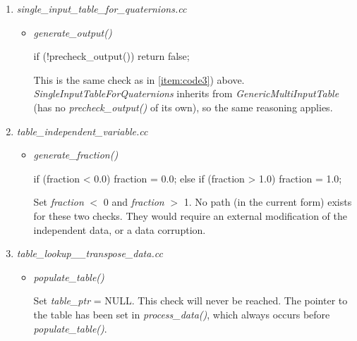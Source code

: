 \documentclass[11pt,fleqn]{report}
\begin{document}
\begin{enumerate}
 \item \textit{single\_input\_table\_for\_quaternions.cc}
   \begin{itemize}
      \item \textit{generate\_output()}
      \begin{code}
if (!precheck_output()) {
  return false;
}
      \end{code}
      This is the same check as in \ref{item:code3}) above.
       \textit{SingleInputTableForQuaternions} inherits from
        \textit{GenericMultiInputTable} (has no \textit{precheck\_output()}
         of its own), so the same reasoning applies.
   \end{itemize}

  \item \textit{table\_independent\_variable.cc}
   \begin{itemize}
      \item \textit{generate\_fraction()}
      \begin{code}
if (fraction < 0.0) {
  fraction = 0.0;
}
else if (fraction > 1.0) {
  fraction = 1.0;
}
      \end{code}
      Set \textit{fraction} $<$ 0 and \textit{fraction} $>$ 1.  No path (in the
      current form) exists for these two checks.  They would require an external
      modification of the independent data, or a data corruption.
   \end{itemize}

   \item \textit{table\_lookup\_\_transpose\_data.cc}
    \begin{itemize}
       \item \textit{populate\_table()}
       \begin{code}
if (table_ptr == NULL) {
  MessageHandler::fail(
      \end{code}
      Set \textit{table\_ptr} = NULL.  This check will never be reached.  The
      pointer to the table has been set in \textit{process\_data()}, which always
      occurs before \textit{populate\_table()}.
    \end{itemize}
\end{enumerate}
\end{document}
